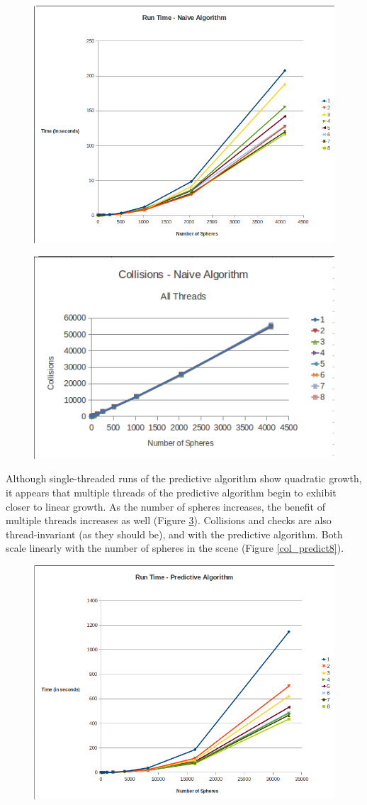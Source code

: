 \documentclass[CEJCS,PDF]{cej} %
\begin{document}
\begin{center}
\begin{figure}
	\includegraphics[width=.45\textwidth]{runtime_naive_allthreads.png}
	\label{rt_naive8}
\end{figure}
\end{center}

\begin{center}
\begin{figure}
	\includegraphics[width=.45\textwidth]{collisions_naive_allthreads.png}
	\label{col_naive8}
\end{figure}
\end{center}

Although single-threaded runs of the predictive algorithm show quadratic growth, it appears that multiple threads of the predictive algorithm begin to exhibit closer to linear growth.  As the number of spheres increases, the benefit of multiple threads increases as well (Figure \ref{rt_predict8}).  Collisions and checks are also thread-invariant (as they should be), and with the predictive algorithm. Both scale linearly with the number of spheres in the scene (Figure \ref{col_predict8}).

\begin{center}
\begin{figure}
	\includegraphics[width=.45\textwidth]{runtime_predictive_allthreads.png}
	\label{rt_predict8}
\end{figure}
\end{center}
\end{document}
